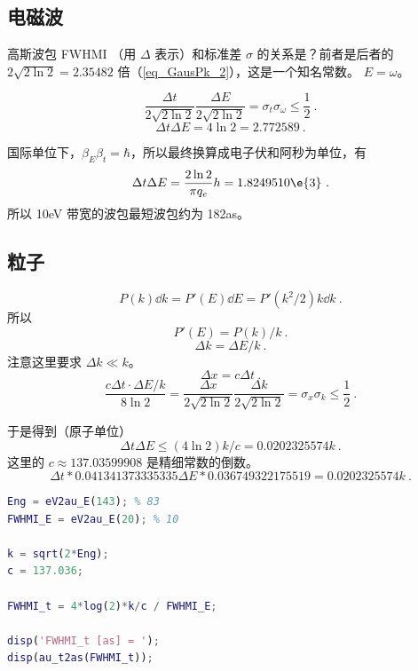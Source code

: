 
\subsection{电磁波}
高斯波包 FWHMI （用 $\Delta$ 表示）和标准差 $\sigma$ 的关系是？前者是后者的 $2\sqrt{2\ln 2} = 2.35482$ 倍（\autoref{eq_GausPk_2}），这是一个知名常数。
$E = \omega$。

\begin{equation}
\frac{\Delta t}{2\sqrt{2\ln 2}}\frac{\Delta E}{2\sqrt{2\ln 2}} = \sigma_t \sigma_\omega \leq \frac{1}{2}~.
\end{equation}
\begin{equation}
\Delta t\Delta E = 4\ln 2 = 2.772589~.
\end{equation}

国际单位下，$\beta_E\beta_t = \hbar$，所以最终换算成电子伏和阿秒为单位，有
\begin{equation}
\Delta t \Delta E  = \frac{2\ln 2}{\pi q_e}h = 1.8249510\e{3}~.
\end{equation}
所以 10eV 带宽的波包最短波包约为 182as。

\subsection{粒子}
\begin{equation}
P(k)\dd{k} = P'(E)\dd{E} = P'(k^2/2)k\dd{k}~.
\end{equation}
所以
\begin{equation}
P'(E) = P(k)/k~.
\end{equation}
\begin{equation}
\Delta k = \Delta E/k~.
\end{equation}
注意这里要求 $\Delta k \ll k$。
\begin{equation}
\Delta x = c\Delta t~.
\end{equation}
\begin{equation}
\frac{c\Delta t \cdot \Delta E/k}{8\ln 2} = \frac{\Delta x}{2\sqrt{2\ln 2}}\frac{\Delta k}{2\sqrt{2\ln 2}} = \sigma_x \sigma_k \leq \frac{1}{2}~.
\end{equation}

于是得到（原子单位）
\begin{equation}
\Delta t\Delta E \leq (4\ln 2)k/c = 0.0202325574 k~.
\end{equation}
这里的 $c \approx 137.03599908$ 是精细常数的倒数。
\begin{equation}
\Delta t * 0.041341373335335  \Delta E * 0.036749322175519 = 0.0202325574 k~.
\end{equation}

\begin{lstlisting}[language=matlab]
% 以上计算的 Matlab 代码
Eng = eV2au_E(143); % 83
FWHMI_E = eV2au_E(20); % 10

k = sqrt(2*Eng);
c = 137.036;

FWHMI_t = 4*log(2)*k/c / FWHMI_E;

disp('FWHMI_t [as] = ');
disp(au_t2as(FWHMI_t));
\end{lstlisting}
